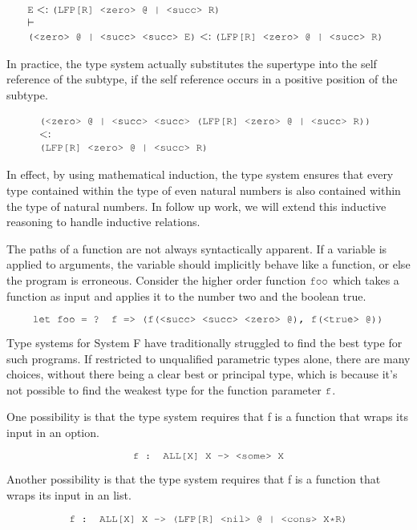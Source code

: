 \documentclass[acmsmall]{acmart}
\theoremstyle{definition}
\begin{document}
\[
  \begin{array}[t]{@{} l}
    \J{E} \subtypes \J{(LFP[R] <zero> @ | <succ> R)}
    \\
    \entails
    \\
    \J{(<zero> @ | <succ> <succ> E)} \subtypes \J{(LFP[R] <zero> @ | <succ> R)}
  \end{array}
\]

In practice, the type system actually substitutes the supertype into
the self reference of the subtype, if the self reference occurs in a positive position of the subtype.

\[
  \begin{array}[t]{@{} l}
    \J{(<zero> @ | <succ> <succ> (LFP[R] <zero> @ | <succ> R))} 
    \\
    \subtypes 
    \\
    \J{(LFP[R] <zero> @ | <succ> R)}
  \end{array}
\]


In effect, by using mathematical induction, the type system ensures that 
every type contained within the type of even natural numbers is also
contained within the type of natural numbers.
In follow up work, we will extend this inductive reasoning to handle inductive relations. 


The paths of a function are not always syntactically apparent. 
If a variable is applied to arguments, the variable should implicitly behave 
like a function, or else the program is erroneous. 
Consider the higher order function $\J{foo}$ which takes a function as input
and applies it to the number two and the boolean true.

\[
  \J{let foo = ? f => (f(<succ> <succ> <zero> @), f(<true> @))}
\]

Type systems for System F have traditionally struggled to find the best
type for such programs. If restricted to unqualified parametric types alone, there are many choices,
without there being a clear best or principal type, 
which is because it's not possible to find the weakest type for the function parameter
$\J{f}$.

One possibility is that the type system requires that f is a function that wraps its
input in an option. 

\[
  \J{f : ALL[X] X -> <some> X}
\]

Another possibility is that the type system requires that f is a function that wraps its
input in an list. 

\[
  \J{f : ALL[X] X -> (LFP[R] <nil> @ | <cons> X*R)}
\]
\end{document}
